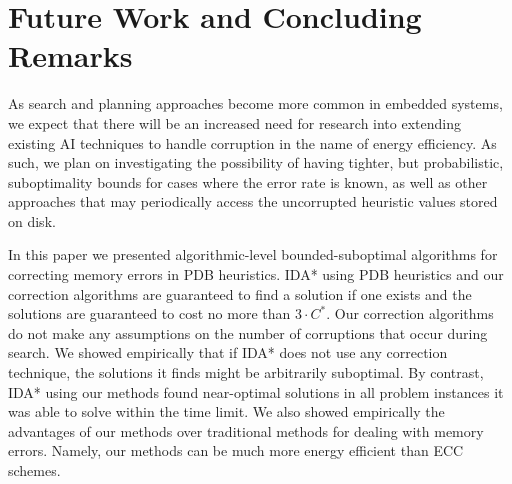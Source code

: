 \documentclass[letterpaper]{article}
\begin{document}

\vspace{-0.15cm}
\section{Future Work and Concluding Remarks}

As search and planning approaches become more common in embedded
systems, we expect that there will be an increased need for research
into extending existing AI techniques to handle corruption in the name
of energy efficiency. As such, we plan on investigating the
possibility of having tighter, but probabilistic, suboptimality bounds
for cases where the error rate is known, as well as other
approaches that may periodically access the uncorrupted heuristic
values stored on disk.


In this paper we presented algorithmic-level bounded-suboptimal algorithms for correcting memory errors in PDB heuristics. %
IDA* using PDB heuristics and our correction algorithms are guaranteed to find a solution if one exists and the solutions are guaranteed to cost no more than $3 \cdot C^*$. Our correction algorithms do not make any assumptions on the number of corruptions that occur during search. We showed empirically that if IDA* does not use any correction technique, the solutions it finds might be arbitrarily suboptimal. %
By contrast, IDA* using our methods found near-optimal solutions in all problem instances it was able to solve within the time limit. We also showed empirically the advantages of our methods over traditional methods for dealing with memory errors. Namely, our methods can be much more energy efficient than ECC schemes. 






\end{document}
